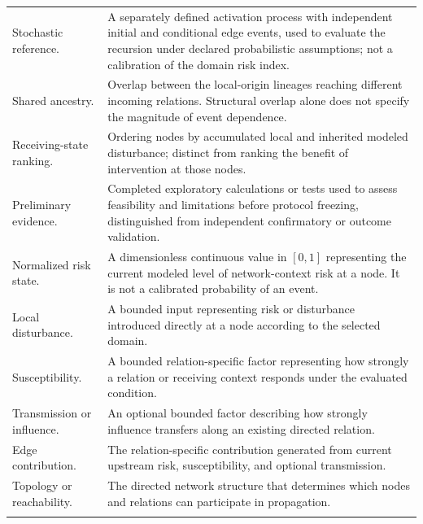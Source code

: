{\begin{longtable}{@{}p{}p{}@{}}
Stochastic reference. &
A separately defined activation process with independent initial and conditional
edge events, used to evaluate the recursion under declared probabilistic assumptions;
not a calibration of the domain risk index. \\
\addlinespace

Shared ancestry. &
Overlap between the local-origin lineages reaching different incoming relations.
Structural overlap alone does not specify the magnitude of event dependence. \\
\addlinespace

Receiving-state ranking. &
Ordering nodes by accumulated local and inherited modeled disturbance;
distinct from ranking the benefit of intervention at those nodes. \\
\addlinespace

Preliminary evidence. &
Completed exploratory calculations or tests used to assess feasibility and limitations before protocol freezing, distinguished from independent confirmatory or outcome validation. \\
\addlinespace

Normalized risk state. &
A dimensionless continuous value in $[0,1]$ representing the current modeled level of network-context risk at a node. It is not a calibrated probability of an event. \\
\addlinespace
 
Local disturbance. &
A bounded input representing risk or disturbance introduced directly at a node according to the selected domain. \\
\addlinespace
 
Susceptibility. &
A bounded relation-specific factor representing how strongly a relation or receiving context responds under the evaluated condition. \\
\addlinespace
 
Transmission or influence. &
An optional bounded factor describing how strongly influence transfers along an existing directed relation. \\
\addlinespace
 
Edge contribution. &
The relation-specific contribution generated from current upstream risk, susceptibility, and optional transmission. \\
\addlinespace
 
Topology or reachability. &
The directed network structure that determines which nodes and relations can participate in propagation. \\
\addlinespace
 

\end{longtable}}
